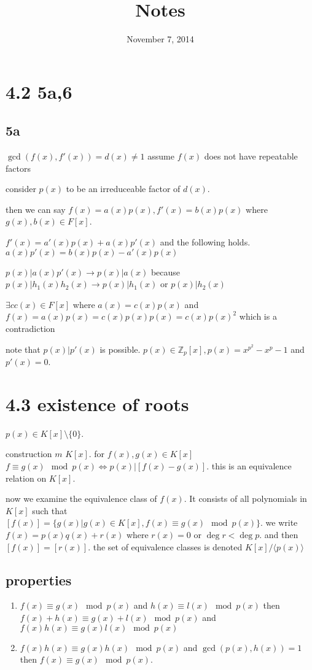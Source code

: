 \documentclass[letterpaper]{article}
\begin{document}
\title{Notes}
\date{November 7, 2014}
\maketitle
\section*{4.2 5a,6}
\subsection*{5a}
$\gcd(f(x),f'(x))=d(x)\ne 1$
assume $f(x)$ does not have repeatable factors

consider $p(x)$ to be an irreduceable factor of $d(x)$.

then we can say $f(x)=a(x)p(x), f'(x)=b(x)p(x)$ where $g(x),b(x)\in F[x]$.

$f'(x)=a'(x)p(x)+a(x)p'(x)$ and the following holds. $a(x)p'(x)=b(x)p(x)-a'(x)p(x)$

$p(x)|a(x)p'(x)\to p(x)|a(x) $ because $p(x)|h_1(x)h_2(x)\to p(x)|h_1(x)$ or $p(x)|h_2(x)$

$\exists cc(x)\in F[x]$ where $a(x)=c(x)p(x)$ and $f(x)=a(x)p(x)=c(x)p(x)p(x)=c(x)p(x)^2$ which is a contradiction

note that $p(x)|p'(x)$ is possible. $p(x)\in \mathbb{Z}_p[x], p(x)=x^{p^2}-x^{p}-1$ and $p'(x)=0$.

\section*{4.3 existence of roots}
$p(x)\in K[x]\setminus\{0\}$.

construction $m$ $K[x]$. for $f(x),g(x)\in K[x]$ $f\equiv g(x)\mod p(x)\Leftrightarrow p(x)|[f(x)-g(x)]$. this is an equivalence relation on $K[x].$

now we examine the equivalence class of $f(x)$. It consists of all polynomials in $K[x]$ such that $[f(x)]=\{g(x)|g(x)\in K[x], f(x)\equiv g(x)\mod p(x)\}$. we write $f(x)=p(x)q(x)+r(x)$ where $r(x)=0$ or $\deg r<\deg p$. and then $[f(x)]=[r(x)]$. the set of equivalence classes is denoted $K[x]/\langle p(x)\rangle$

\subsection*{properties}
\begin{enumerate}
\item
$f(x)\equiv g(x)\mod p(x)$ and $h(x)\equiv l(x)\mod p(x)$ then $f(x)+h(x)\equiv g(x)+l(x)\mod p(x)$ and $f(x)h(x)\equiv g(x)l(x)\mod p(x)$
\item
$f(x)h(x)\equiv g(x)h(x)\mod p(x)$ and $\gcd(p(x),h(x))=1$ then $f(x)\equiv g(x)\mod p(x)$.
\end{enumerate}
\end{document}
